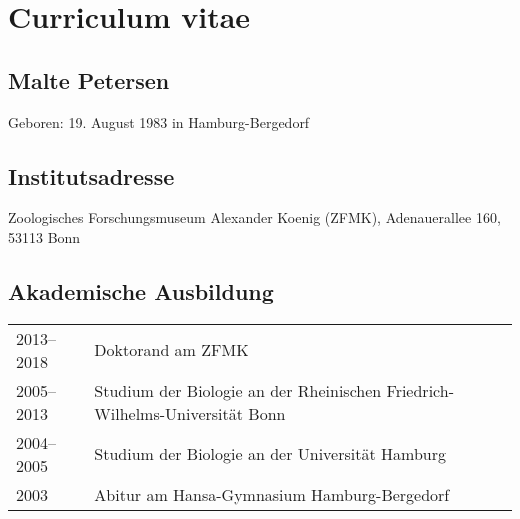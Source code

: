 \chapter*{Curriculum vitae}

\section*{Malte Petersen}

Geboren: 19. August 1983 in Hamburg-Bergedorf

\section*{Institutsadresse}

Zoologisches Forschungsmuseum Alexander Koenig (ZFMK), Adenauerallee 160, 53113 Bonn

\section*{Akademische Ausbildung}

\begin{tabular}[h]{l l}
2013--2018 & Doktorand am ZFMK \\
2005--2013 & Studium der Biologie an der Rheinischen Friedrich-Wilhelms-Universität Bonn\\
2004--2005 & Studium der Biologie an der Universität Hamburg\\
2003 & Abitur am Hansa-Gymnasium Hamburg-Bergedorf \\
\end{tabular}
